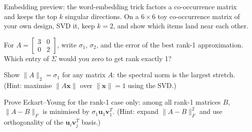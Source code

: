 \begin{exercise}[hard]
Embedding preview: the word-embedding trick factors a
co-occurrence matrix and keeps the top $k$ singular directions. On a
$6\times6$ toy co-occurrence matrix of your own design, SVD it, keep
$k=2$, and show which items land near each other.
\end{exercise}
\begin{exercise}[easy]
For $A=\begin{bmatrix}3&0\\0&2\end{bmatrix}$, write $\sigma_1$,
$\sigma_2$, and the error of the best rank-1 approximation. Which
entry of $\Sigma$ would you zero to get rank exactly 1?
\end{exercise}
\begin{exercise}[medium]
Show $\|A\|_2=\sigma_1$ for any matrix $A$: the spectral norm is the
largest stretch. (Hint: maximise $\|A\mathbf x\|$ over
$\|\mathbf x\|=1$ using the SVD.)
\end{exercise}
\begin{exercise}[hard]
Prove Eckart--Young for the rank-1 case only: among all rank-1
matrices $B$, $\|A-B\|_F$ is minimised by
$\sigma_1\mathbf u_1\mathbf v_1^{T}$. (Hint: expand
$\|A-B\|_F^{2}$ and use orthogonality of the
$\mathbf u_i\mathbf v_j^{T}$ basis.)
\end{exercise}

